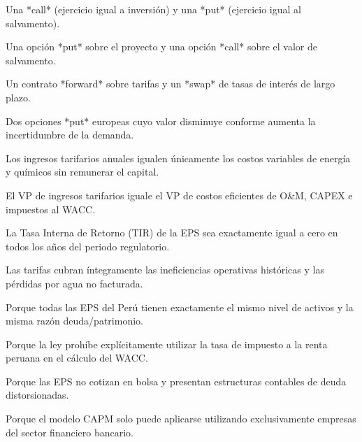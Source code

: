 \begin{opts}
    \item Una *call* (ejercicio igual a inversión) y una *put* (ejercicio igual al salvamento).
    \item Una opción *put* sobre el proyecto y una opción *call* sobre el valor de salvamento.
    \item Un contrato *forward* sobre tarifas y un *swap* de tasas de interés de largo plazo.
    \item Dos opciones *put* europeas cuyo valor disminuye conforme aumenta la incertidumbre de la demanda.
\end{opts}

\begin{opts}
    \item Los ingresos tarifarios anuales igualen únicamente los costos variables de energía y químicos sin remunerar el capital.
    \item El VP de ingresos tarifarios iguale el VP de costos eficientes de O\&M, CAPEX e impuestos al WACC.
    \item La Tasa Interna de Retorno (TIR) de la EPS sea exactamente igual a cero en todos los años del periodo regulatorio.
    \item Las tarifas cubran íntegramente las ineficiencias operativas históricas y las pérdidas por agua no facturada.
\end{opts}

\begin{opts}
    \item Porque todas las EPS del Perú tienen exactamente el mismo nivel de activos y la misma razón deuda/patrimonio.
    \item Porque la ley prohíbe explícitamente utilizar la tasa de impuesto a la renta peruana en el cálculo del WACC.
    \item Porque las EPS no cotizan en bolsa y presentan estructuras contables de deuda distorsionadas.
    \item Porque el modelo CAPM solo puede aplicarse utilizando exclusivamente empresas del sector financiero bancario.
\end{opts}

